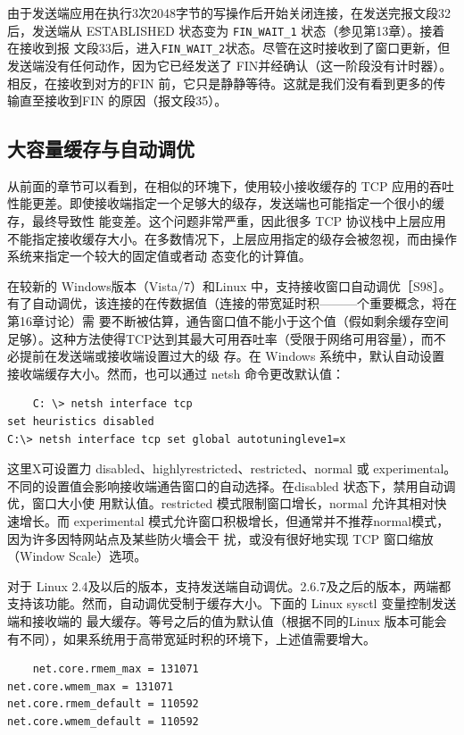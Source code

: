 由于发送端应用在执行3次2048字节的写操作后开始关闭连接，在发送完报文段32后，发送端从 ESTABLISHED 状态变为 \verb|FIN_WAIT_1| 状态（参见第13章）。接着在接收到报
文段33后，进入\verb|FIN_WAIT_2|状态。尽管在这时接收到了窗口更新，但发送端没有任何动作，因为它已经发送了 FIN并经确认（这一阶段没有计时器）。相反，在接收到对方的FIN
前，它只是静静等待。这就是我们没有看到更多的传输直至接收到FIN 的原因（报文段35）。

\subsection{大容量缓存与自动调优}
从前面的章节可以看到，在相似的环塊下，使用较小接收缓存的 TCP 应用的吞吐性能更差。即使接收端指定一个足够大的级存，发送端也可能指定一个很小的缓存，最终导致性
能变差。这个问题非常严重，因此很多 TCP 协议栈中上层应用不能指定接收缓存大小。在多数情况下，上层应用指定的级存会被忽视，而由操作系统来指定一个较大的固定值或者动
态变化的计算值。

在较新的 Windows版本（Vista/7）和Linux 中，支持接收窗口自动调优［S98］。有了自动调优，该连接的在传数据值（连接的带宽延时积———个重要概念，将在第16章讨论）需
要不断被估算，通告窗口值不能小于这个值（假如剩余缓存空间足够）。这种方法使得TCP达到其最大可用吞吐率（受限于网络可用容量），而不必提前在发送端或接收端设置过大的级
存。在 Windows 系统中，默认自动设置接收端缓存大小。然而，也可以通过 netsh 命令更改默认值：
\begin{verbatim}
    C: \> netsh interface tcp
set heuristics disabled
C:\> netsh interface tcp set global autotuningleve1=x
\end{verbatim}

这里X可设置力 disabled、highlyrestricted、restricted、normal 或 experimental。不同的设置值会影响接收端通告窗口的自动选择。在disabled 状态下，禁用自动调优，窗口大小使
用默认值。restricted 模式限制窗口增长，normal 允许其相对快速增长。而 experimental 模式允许窗口积极增长，但通常并不推荐normal模式，因为许多因特网站点及某些防火墻会干
扰，或没有很好地实现 TCP 窗口缩放（Window Scale）选项。

对于 Linux 2.4及以后的版本，支持发送端自动调优。2.6.7及之后的版本，两端都支持该功能。然而，自动调优受制于缓存大小。下面的 Linux sysctl 变量控制发送端和接收端的
最大缓存。等号之后的值为默认值（根据不同的Linux 版本可能会有不同），如果系统用于高带宽延时积的环境下，上述值需要增大。

\begin{verbatim}
    net.core.rmem_max = 131071
net.core.wmem_max = 131071
net.core.rmem_default = 110592
net.core.wmem_default = 110592
\end{verbatim}

